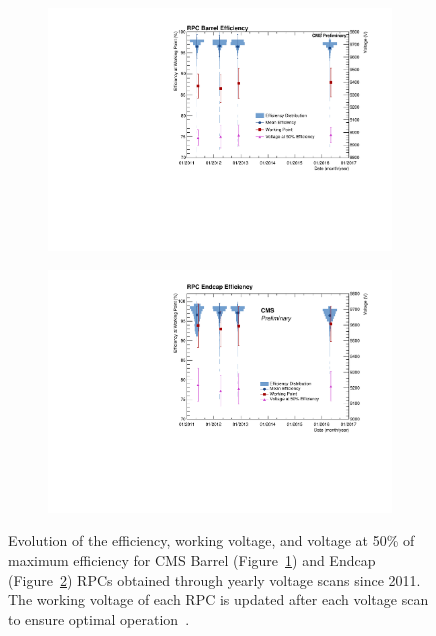 	\begin{figure}[H]
		\begin{subfigure}{0.5\linewidth}
			\centering
			\includegraphics[width = 0.5\plotwidth]{fig/chapt4/HVScanSummaryBarrel.pdf}
			\caption{\label{fig:CMSRPCperf:A}}
		\end{subfigure}
		\begin{subfigure}{0.5\linewidth}
			\centering
			\includegraphics[width = 0.5\plotwidth]{fig/chapt4/HVScanSummaryEndcap.pdf}
			\caption{\label{fig:CMSRPCperf:B}}
		\end{subfigure}
		\caption{\label{fig:CMSRPCperf} Evolution of the efficiency, working voltage, and voltage at 50\% of maximum efficiency for CMS Barrel (Figure~\ref{fig:CMSRPCperf:A}) and Endcap (Figure~\ref{fig:CMSRPCperf:B}) RPCs obtained through yearly voltage scans since 2011. The working voltage of each RPC is updated after each voltage scan to ensure optimal operation~\cite{SHAH2018}.}
	\end{figure}
	
